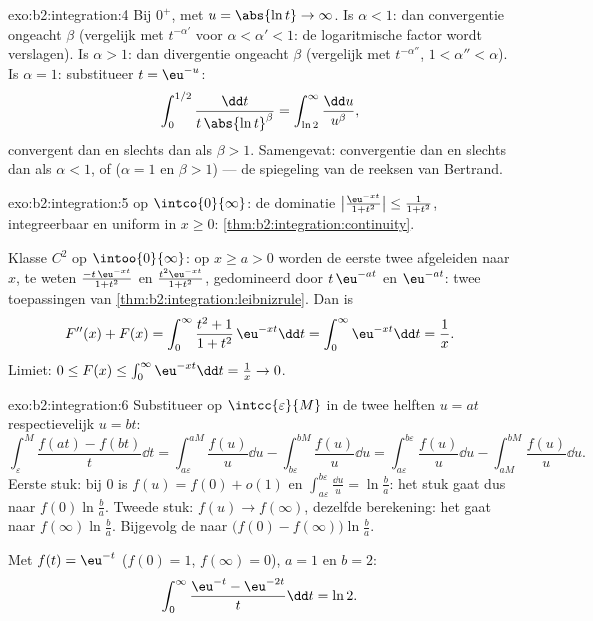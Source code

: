 \begin{solution}{exo:b2:integration:4}
Bij $0^+$, met $u = \abs{\ln t} \to \infty$. Is $\alpha < 1$: dan
convergentie ongeacht $\beta$ (vergelijk met $t^{-\alpha'}$ voor
$\alpha < \alpha' < 1$: de logaritmische factor wordt verslagen).
Is $\alpha > 1$: dan divergentie ongeacht $\beta$ (vergelijk met
$t^{-\alpha''}$, $1 < \alpha'' < \alpha$). Is $\alpha = 1$:
substitueer $t = \eu^{-u}$:
\[
\int_0^{1/2} \frac{\dd t}{t\,\abs{\ln t}^\beta}
= \int_{\ln 2}^{\infty} \frac{\dd u}{u^\beta},
\]
convergent dan en slechts dan als $\beta > 1$. Samengevat:
convergentie dan en slechts dan als $\alpha < 1$, of ($\alpha = 1$
en $\beta > 1$) --- de spiegeling van de reeksen van Bertrand.
\end{solution}

\begin{solution}{exo:b2:integration:5}
 op $\intco{0}{\infty}$: de dominatie
$\bigl|\frac{\eu^{-xt}}{1+t^2}\bigr| \leq \frac{1}{1+t^2}$,
integreerbaar en uniform in $x \geq 0$:
\cref{thm:b2:integration:continuity}.

Klasse $C^2$ op $\intoo{0}{\infty}$: op $x \geq a > 0$ worden de
eerste twee afgeleiden naar $x$, te weten
$\frac{-t\,\eu^{-xt}}{1+t^2}$ en $\frac{t^2\eu^{-xt}}{1+t^2}$,
gedomineerd door $t\,\eu^{-at}$ en $\eu^{-at}$: twee toepassingen
van \cref{thm:b2:integration:leibnizrule}. Dan is
\[
F''(x) + F(x) = \int_0^\infty \frac{t^2 + 1}{1 + t^2}\,\eu^{-xt}\dd
t = \int_0^\infty \eu^{-xt}\dd t = \frac1x .
\]
Limiet: $0 \leq F(x) \leq \int_0^\infty \eu^{-xt}\dd t = \frac1x
\to 0$.
\end{solution}

\begin{solution}{exo:b2:integration:6}
Substitueer op $\intcc{\varepsilon}{M}$ in de twee helften $u = at$
respectievelijk $u = bt$:
\[
\int_\varepsilon^M \frac{f(at) - f(bt)}{t}\dd t
= \int_{a\varepsilon}^{aM}\frac{f(u)}{u}\dd u
- \int_{b\varepsilon}^{bM}\frac{f(u)}{u}\dd u
= \int_{a\varepsilon}^{b\varepsilon} \frac{f(u)}{u}\dd u
- \int_{aM}^{bM} \frac{f(u)}{u}\dd u .
\]
Eerste stuk: bij $0$ is $f(u) = f(0) + o(1)$ en
$\int_{a\varepsilon}^{b\varepsilon} \frac{\dd u}{u} = \ln\frac ba$:
het stuk gaat dus naar $f(0)\ln\frac ba$. Tweede stuk: $f(u) \to
f(\infty)$, dezelfde berekening: het gaat naar $f(\infty)\ln\frac
ba$. Bijgevolg  de  naar
$\bigl(f(0) - f(\infty)\bigr)\ln\frac ba$.

Met $f(t) = \eu^{-t}$ ($f(0) = 1$, $f(\infty) = 0$), $a = 1$ en $b
= 2$:
\[
\int_0^\infty \frac{\eu^{-t} - \eu^{-2t}}{t}\dd t = \ln 2 .
\]
\end{solution}

